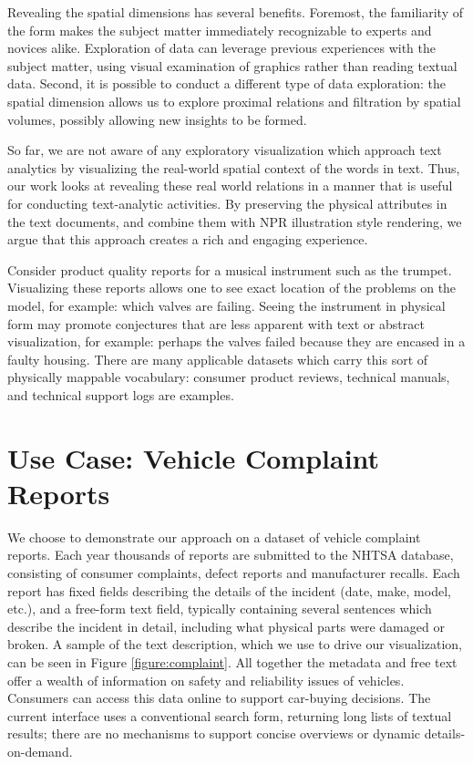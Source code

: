 Revealing the spatial dimensions has several benefits. Foremost, the
familiarity of the form makes the subject matter immediately recognizable
to experts and novices alike. Exploration of data can leverage previous 
experiences with the subject matter, using visual examination of graphics 
rather than reading textual data. Second, it is possible to conduct a different
type of data exploration: the spatial dimension allows us to explore
proximal relations and filtration by spatial volumes, possibly allowing
new insights to be formed.

So far, we are not aware of any exploratory visualization which approach text
analytics by visualizing the real-world spatial context of the words in
text. Thus, our work looks at revealing these real world relations in a manner
that is useful for conducting text-analytic activities. By preserving the physical
attributes in the text documents, and combine them with NPR illustration style 
rendering, we argue that this approach creates a rich and engaging experience.

Consider product quality reports for a musical instrument such as the trumpet.
Visualizing these reports allows one to see exact location of the problems on the
\threed model, for example: which valves are failing. Seeing the instrument
in physical form may promote conjectures that are less apparent
with text or abstract visualization, for example: perhaps the valves
failed because they are encased in a faulty housing. There are many
applicable datasets which carry this sort of physically mappable vocabulary:
consumer product reviews, technical manuals, and technical
support logs are examples.



\section{Use Case: Vehicle Complaint Reports}
We choose to demonstrate our approach on a dataset of vehicle complaint
reports. Each year thousands of reports are submitted to the
NHTSA database, consisting of consumer complaints, defect reports
and manufacturer recalls. Each report has fixed fields describing the
details of the incident (date, make, model, etc.), and a free-form text
field, typically containing several sentences which describe the incident
in detail, including what physical parts were damaged or broken. A sample of the
text description, which we use to drive our visualization, can be seen in Figure
\ref{figure:complaint}.  All together the metadata and free
text offer a wealth of information on safety and reliability issues of
vehicles. Consumers can access this data online to support car-buying
decisions. The current interface uses a conventional search form, returning
long lists of textual results; there are no mechanisms to support
concise overviews or dynamic details-on-demand. 


